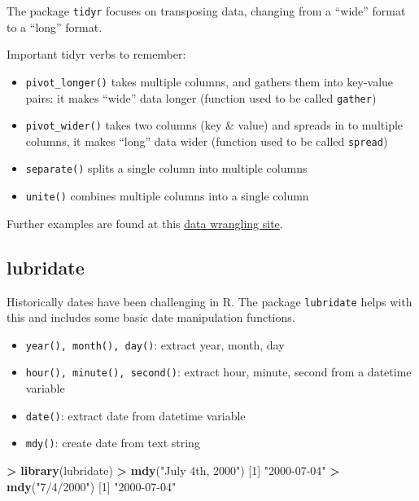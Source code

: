 \documentclass[
]{book}
\newenvironment{Shaded}{\begin{snugshade}}{\end{snugshade}}
\newcommand{\DecValTok}[1]{\textcolor[rgb]{0.00,0.00,0.81}{#1}}
\newcommand{\KeywordTok}[1]{\textcolor[rgb]{0.13,0.29,0.53}{\textbf{#1}}}
\newcommand{\NormalTok}[1]{#1}
\newcommand{\OperatorTok}[1]{\textcolor[rgb]{0.81,0.36,0.00}{\textbf{#1}}}
\newcommand{\StringTok}[1]{\textcolor[rgb]{0.31,0.60,0.02}{#1}}
\providecommand{\tightlist}{%
  \setlength{\itemsep}{0pt}\setlength{\parskip}{0pt}}
\begin{document}
The package \texttt{tidyr} focuses on transposing data, changing from a ``wide'' format to a ``long'' format.

Important tidyr verbs to remember:

\begin{itemize}
\tightlist
\item
  \texttt{pivot\_longer()} takes multiple columns, and gathers them into key-value pairs: it makes ``wide'' data longer (function used to be called \texttt{gather})
\item
  \texttt{pivot\_wider()} takes two columns (key \& value) and spreads in to multiple columns, it makes ``long'' data wider (function used to be called \texttt{spread})
\item
  \texttt{separate()} splits a single column into multiple columns
\item
  \texttt{unite()} combines multiple columns into a single column
\end{itemize}

Further examples are found at this \href{https://rpubs.com/bradleyboehmke/data_wrangling}{data wrangling site}.

\hypertarget{lubridate}{%
\subsection{lubridate}\label{lubridate}}

Historically dates have been challenging in R. The package \texttt{lubridate} helps with this and includes some basic date manipulation functions.

\begin{itemize}
\tightlist
\item
  \texttt{year(),\ month(),\ day()}: extract year, month, day
\item
  \texttt{hour(),\ minute(),\ second()}: extract hour, minute, second from a datetime variable
\item
  \texttt{date()}: extract date from datetime variable
\item
  \texttt{mdy()}: create date from text string
\end{itemize}

\begin{Shaded}
\begin{Highlighting}[]
\OperatorTok{>}\StringTok{ }\KeywordTok{library}\NormalTok{(lubridate)}
\OperatorTok{>}\StringTok{ }\KeywordTok{mdy}\NormalTok{(}\StringTok{"July 4th, 2000"}\NormalTok{)}
\NormalTok{[}\DecValTok{1}\NormalTok{] }\StringTok{"2000-07-04"}
\OperatorTok{>}\StringTok{ }\KeywordTok{mdy}\NormalTok{(}\StringTok{"7/4/2000"}\NormalTok{)}
\NormalTok{[}\DecValTok{1}\NormalTok{] }\StringTok{"2000-07-04"}
\end{Highlighting}
\end{Shaded}
\end{document}

